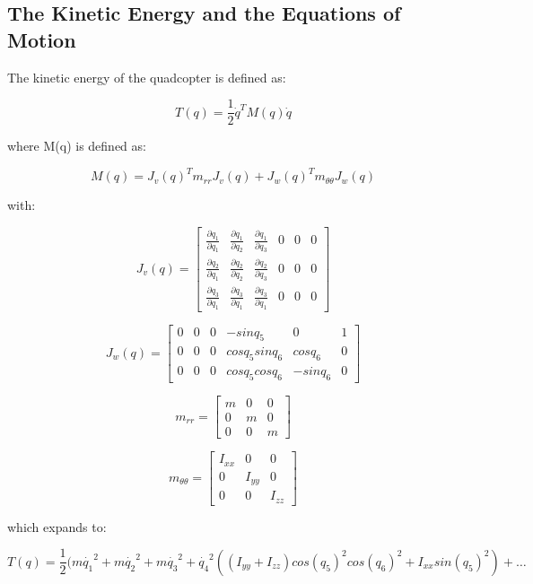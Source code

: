 \documentclass[10pt, letterpaper]{article}
\begin{document}


\subsection*{The Kinetic Energy and the Equations of Motion}

The kinetic energy of the quadcopter is defined as:

\[
T(q)=\frac{1}{2}\dot{q}^{T}M(q)\dot{q}
\]

where M(q) is defined as:

\[
M(q)=J_{v}(q)^{T}m_{rr}J_{v}(q)+J_{w}(q)^{T}m_{\theta\theta}J_{w}(q)
\]

with:

\[
J_{v}(q)=\left[\begin{array}{cccccc}
\frac{\partial q_{1}}{\partial q_{1}} & \frac{\partial q_{1}}{\partial q_{2}} & \frac{\partial q_{1}}{\partial q_{3}} & 0 & 0 & 0\\
\frac{\partial q_{2}}{\partial q_{1}} & \frac{\partial q_{2}}{\partial q_{2}} & \frac{\partial q_{2}}{\partial q_{3}} & 0 & 0 & 0\\
\frac{\partial q_{3}}{\partial q_{1}} & \frac{\partial q_{3}}{\partial q_{1}} & \frac{\partial q_{3}}{\partial q_{1}} & 0 & 0 & 0
\end{array}\right]
\]

\[
J_{w}(q)=\left[\begin{array}{cccccc}
0 & 0 & 0 & -sinq_{5} & 0 & 1\\
0 & 0 & 0 & cosq_{5}sinq_{6} & cosq_{6} & 0\\
0 & 0 & 0 & cosq_{5}cosq_{6} & -sinq_{6} & 0
\end{array}\right]
\]

\[
m_{rr}=\left[\begin{array}{ccc}
m & 0 & 0\\
0 & m & 0\\
0 & 0 & m
\end{array}\right]
\]

\[
m_{\theta\theta}=\left[\begin{array}{ccc}
I_{xx} & 0 & 0\\
0 & I_{yy} & 0\\
0 & 0 & I_{zz}
\end{array}\right]
\]

which expands to:

\[
T(q)=\frac{1}{2}(m\dot{q_{1}}^{2}+m\dot{q_{2}}^{2}+m\dot{q_{3}}^{2}+\dot{q_{4}}^{2}((I_{yy}+I_{zz})cos(q_{5})^{2}cos(q_{6})^{2}+I_{xx}sin(q_{5})^{2})+\ldots
\]
\end{document}
